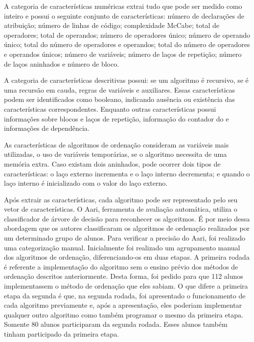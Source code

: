	    A categoria de características numéricas extrai tudo que pode ser medido
	    como inteiro e possui o seguinte conjunto de características: número de
	    declarações de atribuição; número de linhas de código; complexidade McCabe;
		total de operadores; total de operandos; número de operadores único; número
		de operando único; total do número de operadores e operandos; total do número
		de operadores e operandos únicos; número de variáveis; número de laços de
	    repetição; número de laços aninhados e número de bloco.
	    
	    A categoria de características descritivas possui: se um algoritmo é
	    recursivo, se é uma recursão em cauda, regras de variáveis e 
	    auxiliares. Essas características podem ser identificados como booleano,
	    indicando ausência ou existência das características correspondentes. Enquanto
	    outras características possui informações sobre blocos e laços de repetição,
	    informação do contador do  e informações de dependência.
	    
	    As características de algoritmos de ordenação consideram as variáveis mais
	    utilizadas, o uso de variáveis temporárias, se o algoritmo necessita de uma
	    memória extra. Caso existam dois  aninhados, pode ocorrer
	    dois tipos de características: o laço externo incrementa e o laço interno
	    decrementa; e quando o laço interno é inicializado com o valor do laço externo. 
	    
	    Após extrair as características, cada algoritmo pode ser representado pelo seu
	    vetor de características. O Aari, ferramenta de avaliação automática, utiliza
		o classificador de árvore de decisão para reconhecer os algoritmos. É por meio
		dessa abordagem que os autores classificaram os algoritmos de ordenação
		realizados por um determinado grupo de alunos. Para verificar a precisão do
		Aari, foi realizado uma categorização manual. Inicialmente foi realizado um
		agrupamento manual dos algoritmos de ordenação, diferenciando-os em duas
		etapas. A primeira rodada é referente a implementação do algoritmo sem o
		ensino prévio dos métodos de ordenação descritos anteriormente. Desta
		forma, foi pedido para que 112 alunos implementassem o método de ordenação
		que eles sabiam. O que difere a primeira etapa da segunda é que, na segunda
		rodada, foi apresentado o funcionamento de cada algoritmo previamente e,
		após a apresentação, eles poderiam implementar qualquer outro algoritmo
		como também programar o mesmo da primeira etapa. Somente 80 alunos participaram
		da segunda rodada. Esses alunos também tinham participado da primeira etapa. 
		
